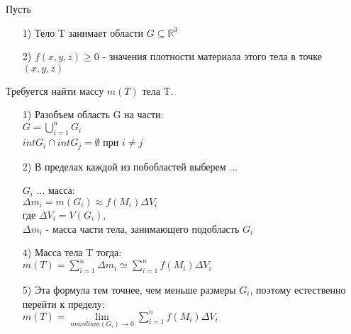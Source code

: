 Пусть 
\begin{enumerate}
	\item[1)] 
	Тело T занимает области $G \subseteq \mathbb{R}^3$
	
	\item[2)]
	$f(x,y,z) \geqslant 0$ - значения плотности материала этого тела в точке $(x,y,z)$
\end{enumerate}

Требуется найти массу $m(T)$ тела T. \\

\begin{enumerate}
	\item[1)]
	Разобъем область G на части: \\
	$G = \bigcup\limits_{i = 1}^{n} G_i$ \\
	$int G_i \cap int G_j = \emptyset$ при $i \neq j$
	
	\item[2)] 
	В пределах каждой из побобластей выберем ...
	
	
	
	$G_i$ ... масса: \\
	$\Delta m_i = m(G_i) \approx f(M_i) \Delta V_i$ \\
	где $\Delta V_i = V(G_i)$, \\
	$\Delta m_i$ - масса части тела, занимающего подобласть  $G_i$
	
	
	\item[4)]
	 Масса тела T тогда: \\
	 $m(T) = \sum\limits_{i = 1}^{n} \Delta m_i \simeq \sum\limits_{i = 1}^{n} f(M_i) \Delta V_i$
	 
	 \item[5)]
	 Эта формула тем точнее, чем меньше размеры $G_i$, поэтому естественно перейти к пределу: \\
	 $m(T) = \lim\limits_{max diam (G_i) \rightarrow 0} \sum\limits_{i = 1}^{n} f(M_i) \Delta V_i$
\end{enumerate}

